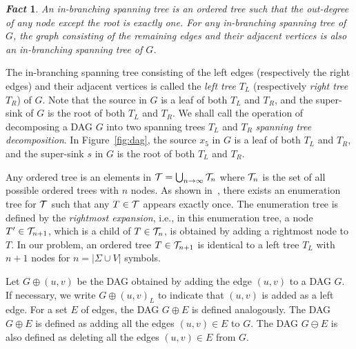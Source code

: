 \documentclass[10pt]{llncs}
\newtheorem{fact}{{\em Fact}}
\begin{document}
\begin{fact}
An in-branching spanning tree is an ordered tree such that the out-degree of any node 
except the root is exactly one. 
For any in-branching spanning tree of $G$, the graph consisting of the
remaining edges and their adjacent vertices is also an in-branching spanning tree of $G$.
\end{fact}

The in-branching spanning tree consisting of the left edges (respectively the right edges) and their adjacent vertices is called the
{\em left tree} $T_L$ (respectively {\em right tree} $T_R$) of $G$.
Note that the source in $G$ is a leaf of both $T_L$ and $T_R$, and
the super-sink of $G$ is the root of both $T_L$ and $T_R$.
We shall call the operation of decomposing a DAG $G$ into two spanning trees $T_L$ and $T_R$ 
{\em spanning tree decomposition}. 
In Figure~\ref{fig:dag}, the source $x_5$ in $G$ is a leaf of both $T_L$ and $T_R$, and 
the super-sink $s$ in $G$ is the root of both $T_L$ and $T_R$.

Any ordered tree is an elements in ${\cal T}=\bigcup_{n\to\infty}{\cal T}_n$
where ${\cal T}_n$ is the set of all possible ordered trees with $n$ nodes.
As shown in~\cite{Asai2002,Zaki2002}, 
there exists an enumeration tree for ${\cal T}$ such that
any $T\in {\cal T}$ appears exactly once. 
The enumeration tree is defined by the {\em rightmost expansion}, i.e.,
in this enumeration tree, a node $T'\in {\cal T}_{n+1}$, 
which is a child of $T\in {\cal T}_n$, is obtained by adding a rightmost node to $T$.
In our problem, an ordered tree $T\in {\cal T}_{n+1}$ is 
identical to a left tree $T_L$ with $n+1$ nodes for $n=|\Sigma\cup V|$ symbols.

Let $G\oplus (u,v)$ be the DAG obtained by adding the edge $(u,v)$ to a DAG $G$.
If necessary, we write $G\oplus (u,v)_L$ to indicate that
$(u,v)$ is added as a left edge.
For a set $E$ of edges, the DAG $G\oplus E$ is defined analogously.
The DAG $G\oplus E$ is defined as adding all the edges $(u,v) \in E$ to $G$.
The DAG $G\ominus E$ is also defined as deleting all the edges $(u,v) \in E$ from $G$.
\end{document}
